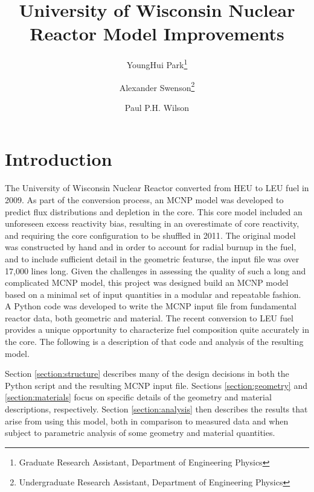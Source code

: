 \documentclass{UWNR_modeling}
\begin{document}
\title{University of Wisconsin Nuclear Reactor Model Improvements}

\author{YoungHui Park\footnote{Graduate Research Assistant, Department of Engineering Physics}}
\author{Alexander Swenson\footnote{Undergraduate Research Assistant, Department of Engineering Physics}}
\author{Paul P.H. Wilson}
\maketitle

\begin{abstract}



\end{abstract}

\section{Introduction}
The University of Wisconsin Nuclear Reactor converted from HEU to LEU fuel in 2009. As part of the conversion process, an MCNP model was developed to predict flux distributions and depletion in the core. This core model included an unforeseen excess reactivity bias, resulting in an overestimate of core reactivity, and requiring the core configuration to be shuffled in 2011\cite{core_shuffle_report}. The original model was constructed by hand and in order to account for radial burnup in the fuel, and to include sufficient detail in the geometric featurse, the input file was over 17,000 lines long. Given the challenges in assessing the quality of such a long and complicated MCNP model, this project was designed build an MCNP model based on a minimal set of input quantities in a modular and repeatable fashion.  A Python code was developed to write the MCNP input file from fundamental reactor data, both geometric and material. The recent conversion to LEU fuel provides a unique opportunity to characterize fuel composition quite accurately in the core. The following is a description of that code and analysis of the resulting model.

Section \ref{section:structure} describes many of the design decisions in both the Python script and the resulting MCNP input file.  Sections \ref{section:geometry} and \ref{section:materials} focus on specific details of the geometry and material descriptions, respectively.  Section \ref{section:analysis} then describes the results that arise from using this model, both in comparison to measured data and when subject to parametric analysis of some geometry and material quantities.
\end{document}

